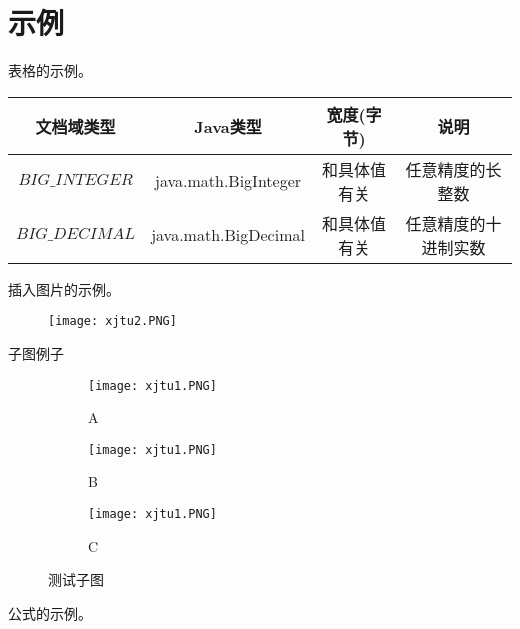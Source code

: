 \section{示例}
表格的示例。

\begin{table}[htbp]\small
  \centering
  \begin{tabular}{cccc}
    \toprule[1.5pt]
    \textbf{文档域类型} & \textbf{Java类型} & \textbf{宽度(字节)} & \textbf{说明} \\
    \midrule[1pt]
    $BIG\_INTEGER$& java.math.BigInteger & 和具体值有关 & 任意精度的长整数 \\
    $BIG\_DECIMAL$ & java.math.BigDecimal & 和具体值有关 & 任意精度的十进制实数 \\
    \bottomrule[1.5pt]
  \end{tabular}
  
\end{table}

插入图片的示例。

\begin{figure}[htbp]
   \centering
   \texttt{[image: xjtu2.PNG]} %
   \label{fig:example}
\end{figure}

子图例子

\begin{figure}[ht!]
    \centering
    \begin{subfigure}{.3\textwidth}
        \centering
        \texttt{[image: xjtu1.PNG]}
        \caption{A}
    \end{subfigure}
    \begin{subfigure}{.3\textwidth}
        \centering
        \texttt{[image: xjtu1.PNG]}
        \caption{B}
    \end{subfigure}
    \begin{subfigure}{.3\textwidth}
        \centering
        \texttt{[image: xjtu1.PNG]}
        \caption{C}
    \end{subfigure}
    \caption{测试子图}
\end{figure}


公式的示例。

